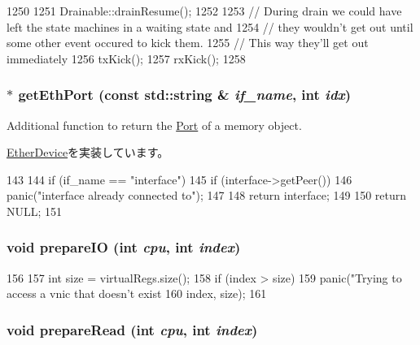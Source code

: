 \begin{DoxyCode}
1250 {
1251     Drainable::drainResume();
1252 
1253     // During drain we could have left the state machines in a waiting state and
1254     // they wouldn't get out until some other event occured to kick them.
1255     // This way they'll get out immediately
1256     txKick();
1257     rxKick();
1258 }
\end{DoxyCode}
\hypertarget{classSinic_1_1Device_a10260c5a583c0894dcdcd1ced50a53ae}{
\subsubsection[{getEthPort}]{ $\ast$ getEthPort (const std::string \& {\em if\_\-name}, \/  int {\em idx})}}
\label{classSinic_1_1Device_a10260c5a583c0894dcdcd1ced50a53ae}
Additional function to return the \hyperlink{classPort}{Port} of a memory object. 

\hyperlink{classEtherDevice_ac1aa24c1f8c0f1ee8bdc3f3d3799f67c}{EtherDevice}を実装しています。


\begin{DoxyCode}
143 {
144     if (if_name == "interface") {
145         if (interface->getPeer())
146             panic("interface already connected to\n");
147 
148         return interface;
149     }
150     return NULL;
151 }
\end{DoxyCode}
\hypertarget{classSinic_1_1Device_a65d0ce31d782d0d1233ce4a464e21fe3}{
\subsubsection[{prepareIO}]{\setlength{\rightskip}{0pt plus 5cm}void prepareIO (int {\em cpu}, \/  int {\em index})}}
\label{classSinic_1_1Device_a65d0ce31d782d0d1233ce4a464e21fe3}



\begin{DoxyCode}
156 {
157     int size = virtualRegs.size();
158     if (index > size)
159         panic("Trying to access a vnic that doesn't exist %
160               index, size);
161 }
\end{DoxyCode}
\hypertarget{classSinic_1_1Device_a90e004f9ca30532075cace46234c6ad5}{
\subsubsection[{prepareRead}]{\setlength{\rightskip}{0pt plus 5cm}void prepareRead (int {\em cpu}, \/  int {\em index})}}
\label{classSinic_1_1Device_a90e004f9ca30532075cace46234c6ad5}



